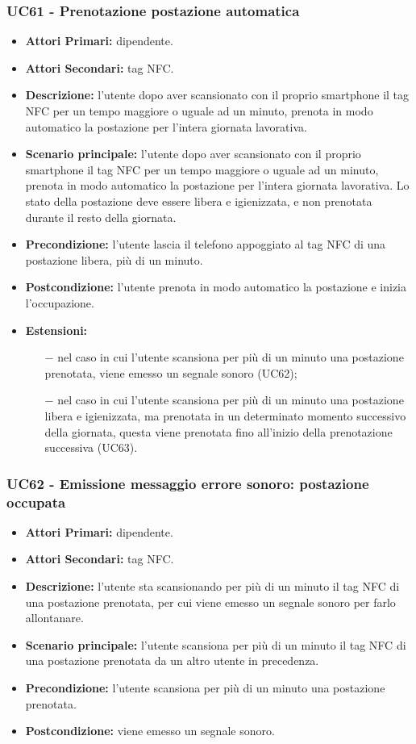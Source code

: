\subsubsection{ UC61 - Prenotazione postazione automatica}
\begin{itemize}
	\item\textbf{Attori Primari:} dipendente.
	\item\textbf{Attori Secondari:} tag NFC.
	\item\textbf{Descrizione:} l’utente dopo aver scansionato con il proprio smartphone il tag NFC per un tempo maggiore o uguale ad un minuto, prenota in modo automatico la postazione per l'intera giornata lavorativa. 
	\item\textbf{Scenario principale:} l’utente dopo aver scansionato con il proprio smartphone il tag NFC per un tempo maggiore o uguale ad un minuto, prenota in modo automatico la postazione per l'intera giornata lavorativa. Lo stato della postazione deve essere libera e igienizzata, e non prenotata durante il resto della giornata.
	\item\textbf{Precondizione:} l'utente lascia il telefono appoggiato al tag NFC di una postazione libera, più di un minuto.
	\item\textbf{Postcondizione:} l'utente prenota in modo automatico la postazione e inizia l'occupazione.
	\item\textbf{Estensioni:}
	\begin{itemize}
		\item[$-$] nel caso in cui l'utente scansiona per più di un minuto una postazione prenotata, viene emesso un segnale sonoro (UC62);
		\item[$-$] nel caso in cui l'utente scansiona per più di un minuto una postazione libera e igienizzata, ma prenotata in un determinato momento successivo della giornata, questa viene prenotata fino all'inizio della prenotazione successiva (UC63).
	\end{itemize}
\end{itemize}
\subsubsection{ UC62 - Emissione messaggio errore sonoro: postazione occupata}
\begin{itemize}
	\item\textbf{Attori Primari:} dipendente.
	\item\textbf{Attori Secondari:} tag NFC.
	\item\textbf{Descrizione:} l'utente sta scansionando per più di un minuto il tag NFC di una postazione prenotata, per cui viene emesso un segnale sonoro per farlo allontanare.
	\item\textbf{Scenario principale:} l’utente scansiona per più di un minuto il tag NFC di una postazione prenotata da un altro utente in precedenza.
	\item\textbf{Precondizione:} l'utente scansiona per più di un minuto una postazione prenotata.
	\item\textbf{Postcondizione:} viene emesso un segnale sonoro.
\end{itemize}

